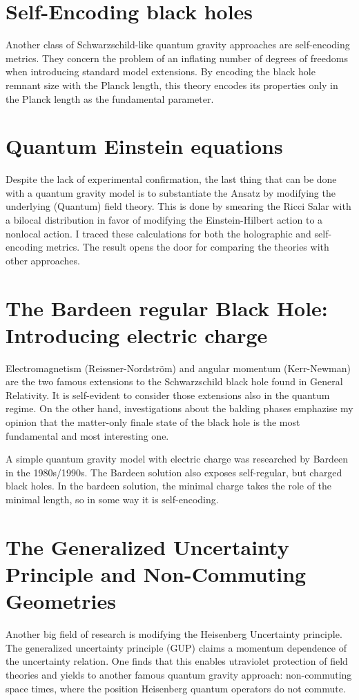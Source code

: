 \documentclass[10pt,a4paper, fleqn]{article}
\begin{document}
\section*{Self-Encoding black holes}
Another class of Schwarzschild-like quantum gravity approaches are self-encoding metrics. They concern the problem of an inflating number of degrees of freedoms when introducing standard model extensions. By encoding the black hole remnant size with the Planck length, this theory encodes its properties only in the Planck length as the fundamental parameter.

\section*{Quantum Einstein equations}
Despite the lack of experimental confirmation, the last thing that can be done with a quantum gravity model is to substantiate the Ansatz by modifying the underlying (Quantum) field theory. This is done by smearing the Ricci Salar with a bilocal distribution in favor of modifying the Einstein-Hilbert action to a nonlocal action. I traced these calculations for both the holographic and self-encoding metrics. The result opens the door for comparing the theories with other approaches.

\section*{The Bardeen regular Black Hole: Introducing electric charge}
Electromagnetism (Reissner-Nordström) and angular momentum (Kerr-Newman) are the two famous extensions to the Schwarzschild black hole found in General Relativity. It is self-evident to consider those extensions also in the quantum regime. On the other hand, investigations about the balding phases emphazise my opinion that the matter-only finale state of the black hole is the most fundamental and most interesting one.

A simple quantum gravity model with electric charge was researched by Bardeen in the 1980s/1990s. The Bardeen solution also exposes self-regular, but charged black holes. In the bardeen solution, the minimal charge takes the role of the minimal length, so in some way it is self-encoding.

\section*{The Generalized Uncertainty Principle and Non-Commuting Geometries}
Another big field of research is modifying the Heisenberg Uncertainty principle. The generalized uncertainty principle (GUP) claims a momentum dependence of the uncertainty relation. One finds that this enables utraviolet protection of field theories and yields to another famous quantum gravity approach: non-commuting space times, where the position Heisenberg quantum operators do not commute.
\end{document}
